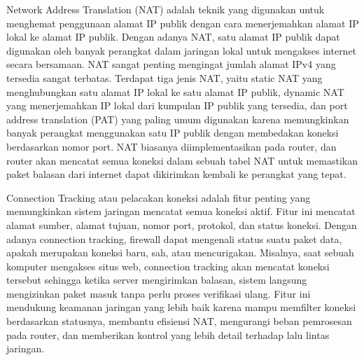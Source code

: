 Network Address Translation (NAT) adalah teknik yang digunakan untuk menghemat penggunaan alamat IP publik dengan cara menerjemahkan alamat IP lokal ke alamat IP publik. Dengan adanya NAT, satu alamat IP publik dapat digunakan oleh banyak perangkat dalam jaringan lokal untuk mengakses internet secara bersamaan. NAT sangat penting mengingat jumlah alamat IPv4 yang tersedia sangat terbatas. Terdapat tiga jenis NAT, yaitu static NAT yang menghubungkan satu alamat IP lokal ke satu alamat IP publik, dynamic NAT yang menerjemahkan IP lokal dari kumpulan IP publik yang tersedia, dan port address translation (PAT) yang paling umum digunakan karena memungkinkan banyak perangkat menggunakan satu IP publik dengan membedakan koneksi berdasarkan nomor port. NAT biasanya diimplementasikan pada router, dan router akan mencatat semua koneksi dalam sebuah tabel NAT untuk memastikan paket balasan dari internet dapat dikirimkan kembali ke perangkat yang tepat.

Connection Tracking atau pelacakan koneksi adalah fitur penting yang memungkinkan sistem jaringan mencatat semua koneksi aktif. Fitur ini mencatat alamat sumber, alamat tujuan, nomor port, protokol, dan status koneksi. Dengan adanya connection tracking, firewall dapat mengenali status suatu paket data, apakah merupakan koneksi baru, sah, atau mencurigakan. Misalnya, saat sebuah komputer mengakses situs web, connection tracking akan mencatat koneksi tersebut sehingga ketika server mengirimkan balasan, sistem langsung mengizinkan paket masuk tanpa perlu proses verifikasi ulang. Fitur ini mendukung keamanan jaringan yang lebih baik karena mampu memfilter koneksi berdasarkan statusnya, membantu efisiensi NAT, mengurangi beban pemrosesan pada router, dan memberikan kontrol yang lebih detail terhadap lalu lintas jaringan.

